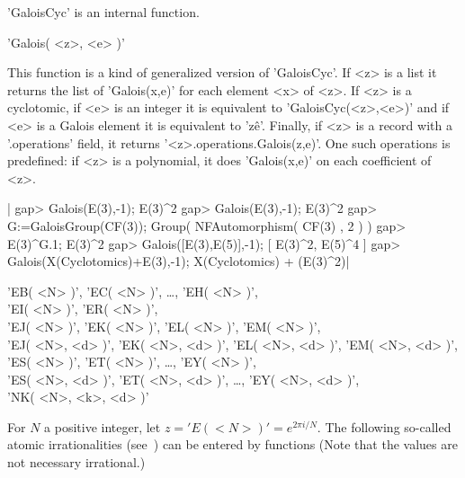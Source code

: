 'GaloisCyc' is an internal function.


'Galois( <z>, <e> )'

This  function is a kind of generalized version of 'GaloisCyc'. If <z> is a
list  it returns the list of 'Galois(x,e)'  for each element <x> of <z>. If
<z>   is  a  cyclotomic,  if  <e>  is   an  integer  it  is  equivalent  to
'GaloisCyc(<z>,<e>)'  and if  <e> is  a Galois  element it is equivalent to
'z\^e'.  Finally, if <z> is a record with a '.operations' field, it returns
'<z>.operations.Galois(z,e)'.  One such operations is predefined: if <z> is
a polynomial, it does 'Galois(x,e)' on each coefficient of <z>.

|    gap> Galois(E(3),-1);
    E(3)^2
    gap> Galois(E(3),-1);
    E(3)^2
    gap> G:=GaloisGroup(CF(3));
    Group( NFAutomorphism( CF(3) , 2 ) )
    gap> E(3)^G.1;
    E(3)^2
    gap> Galois([E(3),E(5)],-1);
    [ E(3)^2, E(5)^4 ]
    gap> Galois(X(Cyclotomics)+E(3),-1);
    X(Cyclotomics) + (E(3)^2)|


'EB( <N> )', 'EC( <N> )', \ldots, 'EH( <N> )',\\
'EI( <N> )', 'ER( <N> )',\\
'EJ( <N> )', 'EK( <N> )', 'EL( <N> )', 'EM( <N> )',\\
'EJ( <N>, <d> )', 'EK( <N>, <d> )', 'EL( <N>, <d> )', 'EM( <N>, <d> )',\\
'ES( <N> )', 'ET( <N> )', \ldots, 'EY( <N> )',\\
'ES( <N>, <d> )', 'ET( <N>, <d> )', \ldots, 'EY( <N>, <d> )',\\
'NK( <N>, <k>, <d> )'

For $N$ a positive integer, let $z = 'E(<N>)' = e^{2 \pi i / N}$.  The
following   so-called  atomic  irrationalities  (see~\cite[Chapter  7,
Section 10]{CCN85}) can be entered by functions (Note that the  values
are not necessary irrational.)\:

